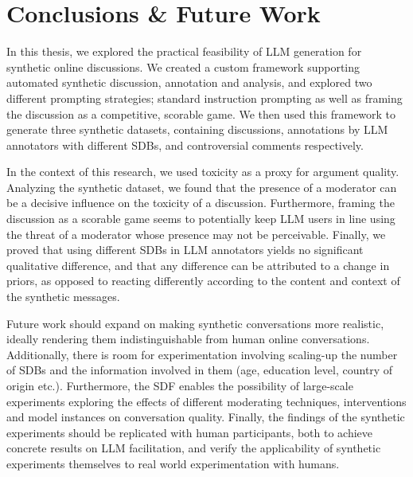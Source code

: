 %
\chapter{Conclusions \& Future Work}
\label{sec:conclusions}

In this thesis, we explored the practical feasibility of LLM generation for synthetic online discussions. We created a custom framework supporting automated synthetic discussion, annotation and analysis, and explored two different prompting strategies; standard instruction prompting as well as framing the discussion as a competitive, scorable game. We then used this framework to generate three synthetic datasets, containing discussions, annotations by LLM annotators with different \acp{SDB}, and controversial comments respectively. 

In the context of this research, we used toxicity as a proxy for argument quality. Analyzing the synthetic dataset, we found that the presence of a moderator can be a decisive influence on the toxicity of a discussion. Furthermore, framing the discussion as a scorable game seems to potentially keep LLM users in line using the threat of a moderator whose presence may not be perceivable. Finally, we proved that using different \acp{SDB} in LLM annotators yields no significant qualitative difference, and that any difference can be attributed to a change in priors, as opposed to reacting differently according to the content and context of the synthetic messages.

Future work should expand on making synthetic conversations more realistic, ideally rendering them indistinguishable from human online conversations. Additionally, there is room for experimentation involving scaling-up the number of \acp{SDB} and the information involved in them (age, education level, country of origin etc.). Furthermore, the \ac{SDF} enables the possibility of large-scale experiments exploring the effects of different moderating techniques, interventions and model instances on conversation quality. Finally, the findings of the synthetic experiments should be replicated with human participants, both to achieve concrete results on LLM facilitation, and verify the applicability of synthetic experiments themselves to real world experimentation with humans.